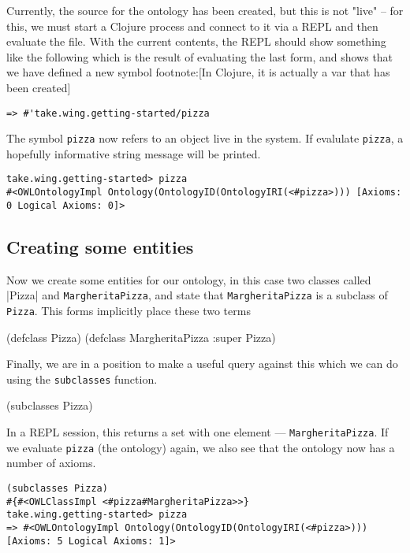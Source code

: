 Currently, the source for the ontology has been created, but this is not
"live" -- for this, we must start a Clojure process and connect to it
via a REPL and then evaluate the file. With the current contents, the
REPL should show something like the following which is the result of
evaluating the last form, and shows that we have defined a new symbol
footnote:[In Clojure, it is actually a var that has been created]

\begin{verbatim}
=> #'take.wing.getting-started/pizza
\end{verbatim}

The symbol \texttt{pizza} now refers to an object live in the system. If
evalulate \texttt{pizza}, a hopefully informative string message will be
printed.


\begin{verbatim}
take.wing.getting-started> pizza
#<OWLOntologyImpl Ontology(OntologyID(OntologyIRI(<#pizza>))) [Axioms: 0 Logical Axioms: 0]>
\end{verbatim}


\subsection{Creating some entities}
\label{sec-4-4}

Now we create some entities for our ontology, in this case two classes
called |Pizza| and \texttt{MargheritaPizza}, and state that \texttt{MargheritaPizza}
is a subclass of \texttt{Pizza}. This forms implicitly place these two terms


\begin{tawny}
(defclass Pizza)
(defclass MargheritaPizza :super Pizza)
\end{tawny}

Finally, we are in a position to make a useful query against this which
we can do using the \texttt{subclasses} function.

\begin{tawny}
(subclasses Pizza)
\end{tawny}

In a REPL session, this returns a set with one element ---
\texttt{MargheritaPizza}. If we evaluate \texttt{pizza} (the ontology) again, we also
see that the ontology now has a number of axioms.


\begin{verbatim}
(subclasses Pizza)
#{#<OWLClassImpl <#pizza#MargheritaPizza>>}
take.wing.getting-started> pizza
=> #<OWLOntologyImpl Ontology(OntologyID(OntologyIRI(<#pizza>))) [Axioms: 5 Logical Axioms: 1]>
\end{verbatim}


